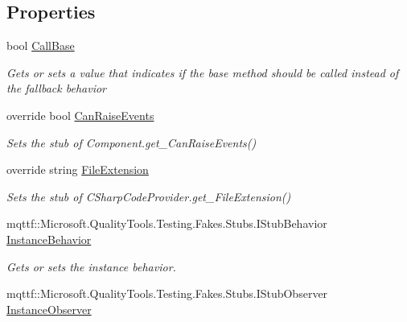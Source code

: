 \subsection*{Properties}
\begin{DoxyCompactItemize}
\item 
bool \hyperlink{class_microsoft_1_1_c_sharp_1_1_fakes_1_1_stub_c_sharp_code_provider_ace9eb4a704a7dc623d1f21f57812c7f7}{Call\-Base}
\begin{DoxyCompactList}\small\item\em Gets or sets a value that indicates if the base method should be called instead of the fallback behavior\end{DoxyCompactList}\item 
override bool \hyperlink{class_microsoft_1_1_c_sharp_1_1_fakes_1_1_stub_c_sharp_code_provider_a4cf8414d7cefc31835b087938b6cb38c}{Can\-Raise\-Events}
\begin{DoxyCompactList}\small\item\em Sets the stub of Component.\-get\-\_\-\-Can\-Raise\-Events()\end{DoxyCompactList}\item 
override string \hyperlink{class_microsoft_1_1_c_sharp_1_1_fakes_1_1_stub_c_sharp_code_provider_a08c6bdabeaf6463dd9aa9a5daddf3053}{File\-Extension}
\begin{DoxyCompactList}\small\item\em Sets the stub of C\-Sharp\-Code\-Provider.\-get\-\_\-\-File\-Extension()\end{DoxyCompactList}\item 
mqttf\-::\-Microsoft.\-Quality\-Tools.\-Testing.\-Fakes.\-Stubs.\-I\-Stub\-Behavior \hyperlink{class_microsoft_1_1_c_sharp_1_1_fakes_1_1_stub_c_sharp_code_provider_ac99f8b97e6cde4c82c3ef5967b7a9845}{Instance\-Behavior}
\begin{DoxyCompactList}\small\item\em Gets or sets the instance behavior.\end{DoxyCompactList}\item 
mqttf\-::\-Microsoft.\-Quality\-Tools.\-Testing.\-Fakes.\-Stubs.\-I\-Stub\-Observer \hyperlink{class_microsoft_1_1_c_sharp_1_1_fakes_1_1_stub_c_sharp_code_provider_ad3bb20dbca2e88de23d8c3a9ac04fb61}{Instance\-Observer}

\end{DoxyCompactItemize}
